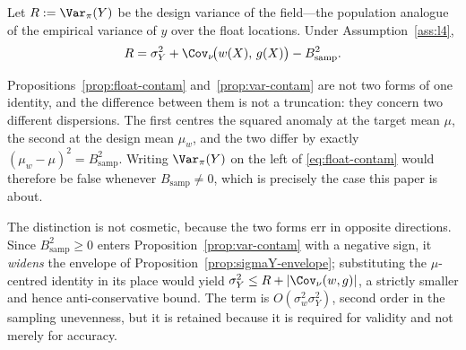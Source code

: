 \begin{proposition}
\label{prop:var-contam}
Let $R:=\Var_\pi(Y)$ be the design variance of the field---the
population analogue of the empirical variance of $y$ over the float
locations. Under Assumption~\ref{ass:l4},
\[
  R=\sigma_Y^2+\Cov_\nu\!\big(w(X),\,g(X)\big)-B_{\mathrm{samp}}^2 .
\]
\end{proposition}

\begin{remark}
\label{rem:var-contam-order}
Propositions~\ref{prop:float-contam} and~\ref{prop:var-contam} are not
two forms of one identity, and the difference between them is not a
truncation: they concern two different dispersions. The first centres the
squared anomaly at the target mean $\mu$, the second at the design mean
$\mu_w$, and the two differ by exactly
$(\mu_w-\mu)^2=B_{\mathrm{samp}}^2$. Writing $\Var_\pi(Y)$ on the left of
\eqref{eq:float-contam} would therefore be false whenever
$B_{\mathrm{samp}}\ne0$, which is precisely the case this paper is about.

The distinction is not cosmetic, because the two forms err in opposite
directions. Since $B_{\mathrm{samp}}^2\ge0$ enters
Proposition~\ref{prop:var-contam} with a negative sign, it \emph{widens}
the envelope of Proposition~\ref{prop:sigmaY-envelope}; substituting the
$\mu$-centred identity in its place would yield
$\sigma_Y^2\le R+|\Cov_\nu(w,g)|$, a strictly smaller and hence
anti-conservative bound. The term is $O(\sigma_w^2\sigma_Y^2)$, second
order in the sampling unevenness, but it is retained because it is
required for validity and not merely for accuracy.
\end{remark}

